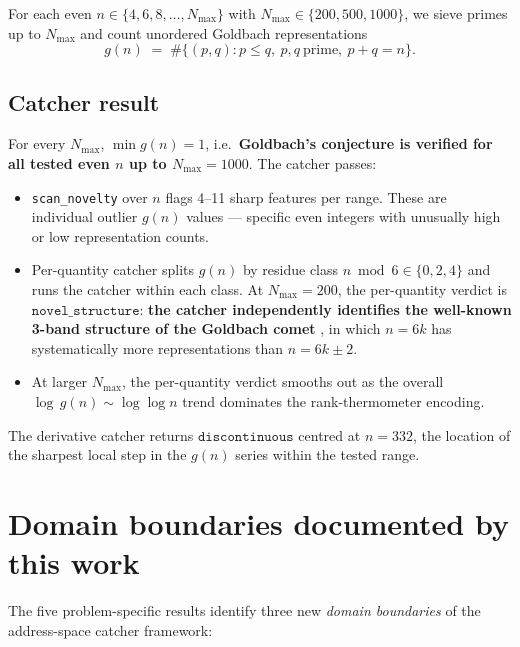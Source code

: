 \documentclass[11pt,letterpaper]{article}
\begin{document}
For each even $n \in \{4, 6, 8, \dots, N_{\max}\}$ with $N_{\max} \in \{200, 500, 1000\}$, we sieve primes up to $N_{\max}$ and count unordered Goldbach representations
\[
g(n) \;=\; \#\{(p, q) : p \le q,\ p, q\ \mathrm{prime},\ p + q = n\}.
\]

\subsection{Catcher result}

For every $N_{\max}$, $\min g(n) = 1$, i.e.\ \textbf{Goldbach's conjecture is verified for all tested even $n$ up to $N_{\max} = 1000$}. The catcher passes:

\begin{itemize}[leftmargin=*,itemsep=0pt]
\item \texttt{scan\_novelty} over $n$ flags 4--11 sharp features per range. These are individual outlier $g(n)$ values --- specific even integers with unusually high or low representation counts.
\item Per-quantity catcher splits $g(n)$ by residue class $n \bmod 6 \in \{0, 2, 4\}$ and runs the catcher within each class. At $N_{\max} = 200$, the per-quantity verdict is $\mathtt{novel\_structure}$: \textbf{the catcher independently identifies the well-known 3-band structure of the Goldbach comet} \cite{goldbach_comet}, in which $n = 6k$ has systematically more representations than $n = 6k \pm 2$.
\item At larger $N_{\max}$, the per-quantity verdict smooths out as the overall $\log\,g(n) \sim \log\log n$ trend dominates the rank-thermometer encoding.
\end{itemize}

The derivative catcher returns $\mathtt{discontinuous}$ centred at $n = 332$, the location of the sharpest local step in the $g(n)$ series within the tested range.

\section{Domain boundaries documented by this work}\label{sec:domain}

The five problem-specific results identify three new \emph{domain boundaries} of the address-space catcher framework:
\end{document}
